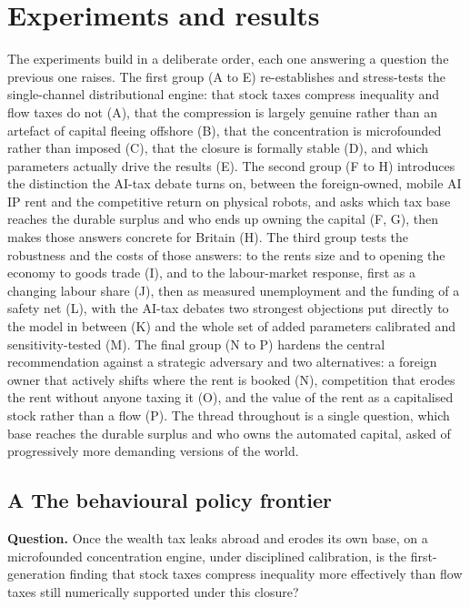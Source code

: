 \documentclass[11pt]{article}
\begin{document}
\hypertarget{experiments}{}
\hypertarget{experiments-and-results}{%
\section{Experiments and results}\label{experiments-and-results}}

The experiments build in a deliberate order, each one answering a
question the previous one raises. The first group (A to E)
re-establishes and stress-tests the single-channel distributional
engine: that stock taxes compress inequality and flow taxes do not (A),
that the compression is largely genuine rather than an artefact of
capital fleeing offshore (B), that the concentration is microfounded
rather than imposed (C), that the closure is formally stable (D), and
which parameters actually drive the results (E). The second group (F to
H) introduces the distinction the AI-tax debate turns on, between the
foreign-owned, mobile AI IP rent and the competitive return on physical
robots, and asks which tax base reaches the durable surplus and who ends
up owning the capital (F, G), then makes those answers concrete for
Britain (H). The third group tests the robustness and the costs of those
answers: to the rent\textquotesingle s size and to opening the economy
to goods trade (I), and to the labour-market response, first as a
changing labour share (J), then as measured unemployment and the funding
of a safety net (L), with the AI-tax debate\textquotesingle s two
strongest objections put directly to the model in between (K) and the
whole set of added parameters calibrated and sensitivity-tested (M). The
final group (N to P) hardens the central recommendation against a
strategic adversary and two alternatives: a foreign owner that actively
shifts where the rent is booked (N), competition that erodes the rent
without anyone taxing it (O), and the value of the rent as a capitalised
stock rather than a flow (P). The thread throughout is a single
question, which base reaches the durable surplus and who owns the
automated capital, asked of progressively more demanding versions of the
world.

\hypertarget{a-the-behavioural-policy-frontier}{%
\subsection{A \textperiodcentered{} The behavioural policy
frontier}\label{a-the-behavioural-policy-frontier}}

\textbf{Question.} Once the wealth tax leaks abroad and erodes its own
base, on a microfounded concentration engine, under disciplined
calibration, is the first-generation finding that stock taxes compress
inequality more effectively than flow taxes still numerically supported
under this closure?
\end{document}
